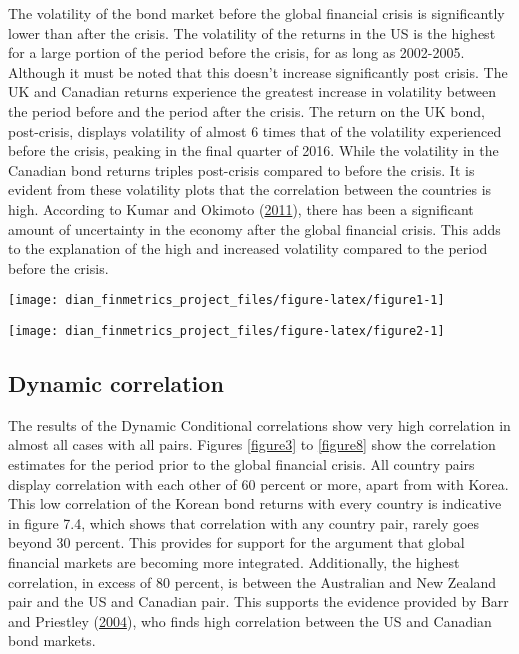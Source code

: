 \documentclass[11pt,preprint, authoryear]{elsarticle}
\let\origfigure\figure
\let\endorigfigure\endfigure
\renewenvironment{figure}[1][2] {
    \expandafter\origfigure\expandafter[H]
} {
    \endorigfigure
}
\numberwithin{equation}{section}
\numberwithin{figure}{section}
\numberwithin{table}{section}
\begin{document}
The volatility of the bond market before the global financial crisis is
significantly lower than after the crisis. The volatility of the returns
in the US is the highest for a large portion of the period before the
crisis, for as long as 2002-2005. Although it must be noted that this
doesn't increase significantly post crisis. The UK and Canadian returns
experience the greatest increase in volatility between the period before
and the period after the crisis. The return on the UK bond, post-crisis,
displays volatility of almost 6 times that of the volatility experienced
before the crisis, peaking in the final quarter of 2016. While the
volatility in the Canadian bond returns triples post-crisis compared to
before the crisis. It is evident from these volatility plots that the
correlation between the countries is high. According to Kumar and
Okimoto (\protect\hyperlink{ref-kumar2011}{2011}), there has been a
significant amount of uncertainty in the economy after the global
financial crisis. This adds to the explanation of the high and increased
volatility compared to the period before the crisis.

\begin{figure}[H]

{\centering \texttt{[image: dian\_finmetrics\_project\_files/figure-latex/figure1-1]} 

}

\caption{Volatility plot \label{lit}}\label{fig:figure1}
\end{figure}

\begin{figure}[H]

{\centering \texttt{[image: dian\_finmetrics\_project\_files/figure-latex/figure2-1]} 

}

\caption{Volatility plot post-crisis \label{lit}}\label{fig:figure2}
\end{figure}

\subsection{\texorpdfstring{Dynamic correlation
\label{corr}}{Dynamic correlation }}\label{dynamic-correlation}

The results of the Dynamic Conditional correlations show very high
correlation in almost all cases with all pairs. Figures \ref{figure3} to
\ref{figure8} show the correlation estimates for the period prior to the
global financial crisis. All country pairs display correlation with each
other of 60 percent or more, apart from with Korea. This low correlation
of the Korean bond returns with every country is indicative in figure
7.4, which shows that correlation with any country pair, rarely goes
beyond 30 percent. This provides for support for the argument that
global financial markets are becoming more integrated. Additionally, the
highest correlation, in excess of 80 percent, is between the Australian
and New Zealand pair and the US and Canadian pair. This supports the
evidence provided by Barr and Priestley
(\protect\hyperlink{ref-barr2004}{2004}), who finds high correlation
between the US and Canadian bond markets.
\end{document}
